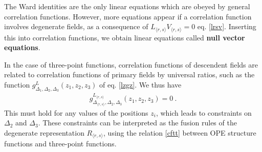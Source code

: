 \documentclass[12pt,a4paper,notitlepage]{report}
\numberwithin{equation}{section}
\theoremstyle{break}
\begin{document}
The Ward identities are the only linear equations which are obeyed by general correlation functions.
However, more equations appear if a correlation function involves degenerate fields, as a consequence of $L_{\langle r,s \rangle} V_{\langle r,s \rangle} = 0$ eq. \eqref{lrsv}.
Inserting this into correlation functions, we obtain linear equations called \textbf{\boldmath null vector equations}. 

In the case of three-point functions, correlation functions of descendent fields are related to correlation functions of primary fields by universal ratios, such as the function $g^{L}_{\Delta_1,\Delta_2,\Delta_3}(z_1,z_2,z_3)$ of eq. \eqref{lzgz}.
We thus have 
\begin{align}
 g^{L_{\langle r,s \rangle}}_{\Delta_{\langle r,s \rangle},\Delta_2,\Delta_3}(z_1,z_2,z_3) = 0 \ .
\end{align}
This must hold for any values of the positions $z_i$, which leads to constraints on $\Delta_2$ and $\Delta_3$.
These constraints can be interpreted as the fusion rules of the degenerate representation $R_{\langle r,s \rangle}$, using the relation \eqref{cftt} between OPE structure functions and three-point functions.
\end{document}

